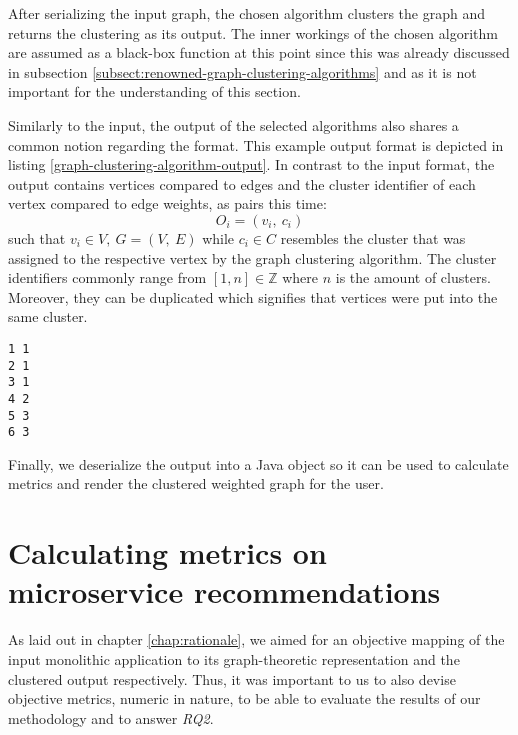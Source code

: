 \documentclass[12pt,a4paper]{report}
\begin{document}
After serializing the input graph, the chosen algorithm clusters the graph
and returns the clustering as its output. The inner workings of the chosen
algorithm are assumed as a black-box function at this point since this was
already discussed in subsection \ref{subsect:renowned-graph-clustering-algorithms}
and as it is not important for the understanding of this section.

Similarly to the input, the output of the selected algorithms also shares
a common notion regarding the format. This example output format is depicted
in listing \ref{graph-clustering-algorithm-output}.
In contrast to the input format, the output contains vertices compared to edges
and the cluster identifier of each vertex compared to edge weights,
as pairs this time:
\[
  O_i = (v_i, \ c_i)
\]
such that \(v_i \in V, \ G = (V, \ E)\) while \(c_i \in C\) resembles the
cluster that was assigned to the respective vertex by the graph clustering
algorithm. The cluster identifiers commonly range from \([1, n] \in \mathbb{Z}\)
where \(n\) is the amount of clusters. Moreover, they can be duplicated
which signifies that vertices were put into the same cluster.

\begin{lstlisting}[caption=Example graph clustering algorithm output, label=graph-clustering-algorithm-output, breaklines=true]
1 1
2 1
3 1
4 2
5 3
6 3
\end{lstlisting}

Finally, we deserialize the output into a Java object so it can be used to
calculate metrics and render the clustered weighted graph for the user.




\chapter{Calculating metrics on microservice recommendations} \label{chap:metrics}

As laid out in chapter \ref{chap:rationale}, we aimed for an objective
mapping of the input monolithic application to its graph-theoretic representation
and the clustered output respectively.
Thus, it was important to us to also devise objective metrics, numeric in nature,
to be able to evaluate the results of our methodology and to answer \textit{RQ2}.
\end{document}

